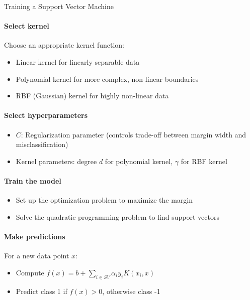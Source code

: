\begin{KR}{Training a Support Vector Machine}
    \paragraph{Select kernel}
    Choose an appropriate kernel function:
    \begin{itemize}
        \item Linear kernel for linearly separable data
        \item Polynomial kernel for more complex, non-linear boundaries
        \item RBF (Gaussian) kernel for highly non-linear data
    \end{itemize}
    
    \paragraph{Select hyperparameters}
    \begin{itemize}
        \item $C$: Regularization parameter (controls trade-off between margin width and misclassification)
        \item Kernel parameters: degree $d$ for polynomial kernel, $\gamma$ for RBF kernel
    \end{itemize}
    
    \paragraph{Train the model}
    \begin{itemize}
        \item Set up the optimization problem to maximize the margin
        \item Solve the quadratic programming problem to find support vectors
    \end{itemize}
    
    \paragraph{Make predictions}
    For a new data point $x$:
    \begin{itemize}
        \item Compute $f(x) = b + \sum_{i \in SV} \alpha_i y_i K(x_i, x)$
        \item Predict class 1 if $f(x) > 0$, otherwise class -1
    \end{itemize}
    \end{KR}

